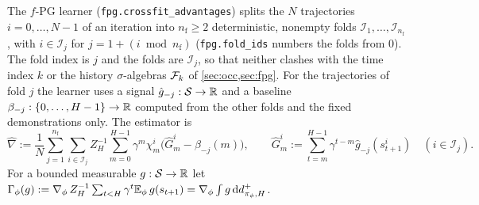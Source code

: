 The $f$-PG learner (\texttt{fpg.crossfit\_advantages}) splits the $N$ trajectories $i=0,\dots,N-1$ of an iteration into $n_{\mathrm f}\ge2$ deterministic, nonempty folds $\mathcal I_1,\dots,\mathcal I_{n_{\mathrm f}}$, with $i\in\mathcal I_j$ for $j=1+(i\bmod n_{\mathrm f})$ (\texttt{fpg.fold\_ids} numbers the folds from 0).
The fold index is $j$ and the folds are $\mathcal I_j$, so that neither clashes with the time index $k$ or the history $\sigma$-algebras $\mathcal{F}_k$ of \cref{sec:occ,sec:fpg}.
For the trajectories of fold $j$ the learner uses a signal $\hat g_{-j}:\mathcal{S}\to\mathbb{R}$ and a baseline $\beta_{-j}:\{0,\dots,H-1\}\to\mathbb{R}$ computed from the other folds and the fixed demonstrations only.
The estimator is
\[
\hat\nabla:=\frac1N\sum_{j=1}^{n_{\mathrm f}}\sum_{i\in\mathcal I_j}Z_H^{-1}\sum_{m=0}^{H-1}\gamma^m\chi^i_m\big(\hat G^{i}_m-\beta_{-j}(m)\big),\qquad
\hat G^{i}_m:=\sum_{t=m}^{H-1}\gamma^{t-m}\hat g_{-j}(s^i_{t+1})\quad(i\in\mathcal I_j).
\]
For a bounded measurable $g:\mathcal{S}\to\mathbb{R}$ let $\Gamma_\phi(g):=\nabla_\phi\,Z_H^{-1}\sum_{t<H}\gamma^t\mathbb{E}_\phi\,g(s_{t+1})=\nabla_\phi\int g\,\mathrm{d} d^+_{\pi_\phi,H}$.

